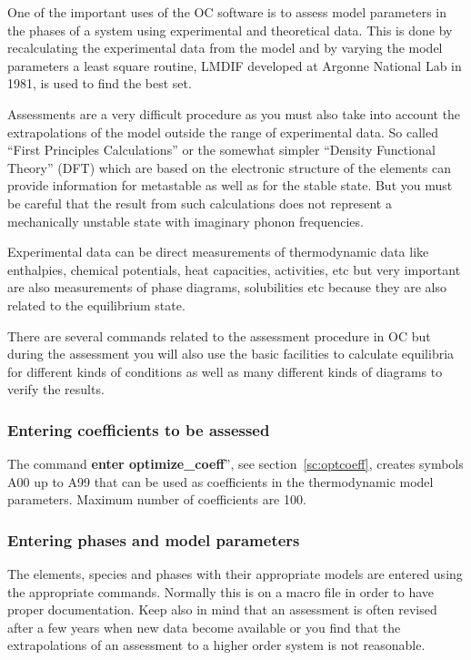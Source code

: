 \documentclass[11pt]{article}
\begin{document}
One of the important uses of the OC software is to assess model
parameters in the phases of a system using experimental and
theoretical data.  This is done by recalculating the experimental data
from the model and by varying the model parameters a least square
routine, LMDIF developed at Argonne National Lab in 1981, is used to
find the best set.

Assessments are a very difficult procedure as you must also take into
account the extrapolations of the model outside the range of
experimental data.  So called ``First Principles Calculations'' or the
somewhat simpler ``Density Functional Theory'' (DFT) which are based
on the electronic structure of the elements can provide information
for metastable as well as for the stable state.  But you must be
careful that the result from such calculations does not represent a
mechanically unstable state with imaginary phonon frequencies.

Experimental data can be direct measurements of thermodynamic data
like enthalpies, chemical potentials, heat capacities, activities, etc
but very important are also measurements of phase diagrams,
solubilities etc because they are also related to the equilibrium
state.

There are several commands related to the assessment procedure in OC
but during the assessment you will also use the basic facilities to
calculate equilibria for different kinds of conditions as well as many
different kinds of diagrams to verify the results.

\subsubsection{Entering coefficients to be assessed}

The command {\bf enter optimize\_coeff}'', see
section~\ref{sc:optcoeff}, creates symbols A00 up to A99 that can be
used as coefficients in the thermodynamic model parameters.  Maximum
number of coefficients are 100.

\subsubsection{Entering phases and model parameters}

The elements, species and phases with their appropriate models are
entered using the appropriate commands.  Normally this is on a macro
file in order to have proper documentation.  Keep also in mind that an
assessment is often revised after a few years when new data become
available or you find that the extrapolations of an assessment to a
higher order system is not reasonable.
\end{document}
